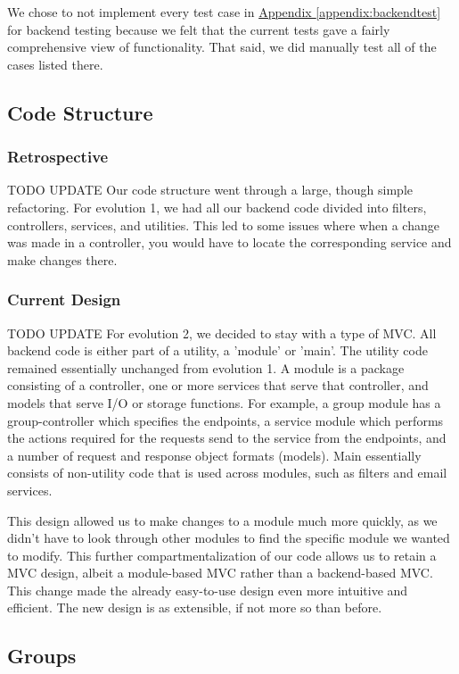 \documentclass[12pt]{article}
\begin{document}
We chose to not implement every test case in \hyperref[appendix:backendtest]{Appendix \ref{appendix:backendtest}} for backend testing because we felt that the current tests gave a fairly comprehensive view of functionality. That said, we did manually test all of the cases listed there.


\subsection{Code Structure}
\subsubsection{Retrospective}
{\huge TODO UPDATE}
Our code structure went through a large, though simple refactoring. For evolution 1, we had all our backend code divided into filters, controllers, services, and utilities. This led to some issues where when a change was made in a controller, you would have to locate the corresponding service and make changes there. 
\subsubsection{Current Design}
{\huge TODO UPDATE}
For evolution 2, we decided to stay with a type of MVC. All backend code is either part of a utility, a 'module' or 'main'. The utility code remained essentially unchanged from evolution 1. A module is a package consisting of a controller, one or more services that serve that controller, and models that serve I/O or storage functions. For example, a group module has a group-controller which specifies the endpoints, a service module which performs the actions required for the requests send to the service from the endpoints, and a number of request and response object formats (models). Main essentially consists of non-utility code that is used across modules, such as filters and email services. 

This design allowed us to make changes to a module much more quickly, as we didn't have to look through other modules to find the specific module we wanted to modify. This further compartmentalization of our code allows us to retain a MVC design, albeit a module-based MVC rather than a backend-based MVC. This change made the already easy-to-use design even more intuitive and efficient. The new design is as extensible, if not more so than before. 

\subsection{Groups}
\label{sec:GROUPS}
\end{document}
